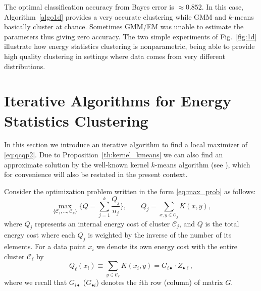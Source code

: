 \documentclass[aps,preprint,nofootinbib,floatfix]{revtex4-1}
\newcommand\kk{K}
\newcommand\C{{\mathcal{C}}}
\begin{document}
The optimal classification accuracy from Bayes error is $\approx 0.852$.
In this case,
Algorithm~\ref{algo1d} provides a very accurate clustering while
GMM and $k$-means basically cluster at chance.
Sometimes GMM/EM  was unable to estimate the parameters 
thus giving zero accuracy.
The two simple experiments of Fig.~\ref{fig:1d} illustrate
how energy statistics clustering is nonparametric, being able
to provide high quality clustering in settings where data comes
from very different distributions.


\section{Iterative Algorithms for Energy Statistics Clustering}
\label{sec:algo}

In this section we introduce an iterative algorithm to find a local
maximizer of \eqref{eq:qcqp2}. Due to 
Proposition~\ref{th:kernel_kmeans} we can also find an approximate
solution by the well-known kernel $k$-means algorithm 
(see \cite{Dhillon2,Dhillon}), which 
for convenience will also be restated in the present context.

Consider the optimization problem 
written in the form \eqref{eq:max_prob} as follows:
\begin{equation}
\label{eq:maxQ}
\max_{\{ \C_1,\dotsc,\C_k \}} 
\bigg\{ Q = \sum_{j=1}^k \dfrac{Q_j}{n_j}  \bigg\},
\qquad Q_j = \sum_{x,y\in\C_j} \kk(x,y),
\end{equation}
where $Q_j$ represents an internal energy cost of cluster $\C_j$, and
$Q$ is the total energy cost where each $Q_j$ 
is weighted by the inverse
of the number of its elements. For a data point $x_i$ we denote
its own energy cost
with the entire cluster $\C_\ell$ by
\begin{equation}
\label{eq:costxij}
Q_\ell(x_i) \equiv \sum_{y\in\C_\ell} \kk(x_i, y) = 
G_{i \bullet} \cdot Z_{\bullet \ell},
\end{equation}
where we recall that $G_{i\bullet}$ ($G_{\bullet i}$) denotes
the $i$th row (column) of matrix $G$.
\end{document}
